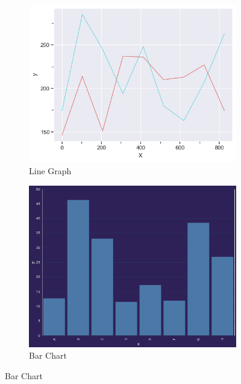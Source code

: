 \begin{figure}
    \centering
    \begin{subfigure}[b]{0.32\textwidth}
        \centering
        \includegraphics[width=\textwidth]{figures/body/methodology/random_line.png}
        \caption{Line Graph}
        \label{figure:random_line}
    \end{subfigure}
    \hfill
    \begin{subfigure}[b]{0.32\textwidth}
        \centering
        \includegraphics[width=\textwidth]{figures/body/methodology/random_bar.png}
        \caption{Bar Chart}
        \label{figure:random_bar}
    \end{subfigure}

\end{figure}
